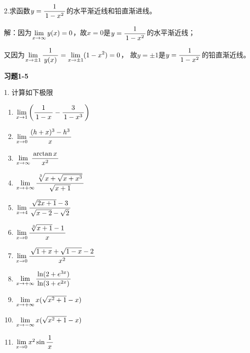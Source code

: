 \bigskip
2.求函数$y=\df1{1-x^2}$的水平渐近线和铅直渐进线。


解：因为$\limx{\infty}y(x)=0$，故$x=0$是$y=\df1{1-x^2}$的水平渐近线；

又因为$\limx{\pm1}\df1{y(x)}=\limx{\pm1}(1-x^2)=0$，
故$y=\pm1$是$y=\df1{1-x^2}$的铅直渐近线。\fin

\bigskip

\begin{center}
	\bf 习题1-5
\end{center}

1. 计算如下极限
\begin{enumerate}[(1)]
	\setlength{\itemindent}{1cm}
    \item $\limx{1}\left(\df1{1-x}-\df3{1-x^3}\right)$
    \item $\limx0\df{(h+x)^3-h^3}x$
    \item $\limx{\infty}\df{\arctan x}{x^2}$
    \item $\limx{+\infty}\df{\sqrt[3]{x+\sqrt{x+x^3}}}{\sqrt{x+1}}$
    \item $\limx4\df{\sqrt{2x+1}-3}{\sqrt{x-2}-\sqrt2}$
    \item $\limx0\df{\sqrt[3]{x+1}-1}x$
    \item $\limx0\df{\sqrt{1+x}+\sqrt{1-x}-2}{x^2}$
    \item $\limx{+\infty}\df{\ln(2+e^{3x})}{\ln(3+e^{2x})}$
    \item $\limx{+\infty}x(\sqrt{x^2+1}-x)$
    \item $\limx{-\infty}x(\sqrt{x^2+1}-x)$
    \item $\limx0x^2\sin\df1x$
\end{enumerate}

